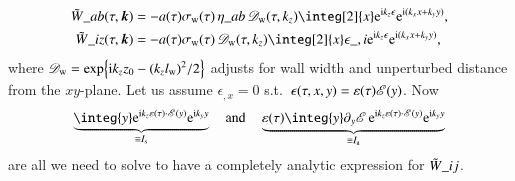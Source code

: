     \begin{equation}\label{eq:pertwalls:gws:Ft_SE_tensor_general}
        \begin{split}
            \Twf\_{ab}(\tau, \vec{k}) &=  -a (\tau)\sigma\ped{w}(\tau)  \, \eta\_{ab} \, \mathscr{D}\ped{w}(\tau,k_z) \integ[2]{x} \eu[\im k_z \epsilon] \eu[\im (k_x x+k_y y)], \\
            \Twf\_{iz}(\tau, \vec{k})
            &= -a (\tau)\sigma\ped{w}(\tau) \,\mathscr{D}\ped{w}(\tau, k_z)  \integ[2]{x} \epsilon\_{,i}  \eu[\im k_z \epsilon] \eu[\im (k_x x+k_y y)],%
         \end{split}
    \end{equation}
    where $\mathscr{D}_\mathrm{w}= \exp{ \ensuremath{\mathrm{i}}k_z z_0-{(k_z l\ensuremath{_\mathrm{w}})}^2/2 }$ adjusts for wall width and unperturbed distance from the $xy$-plane. %
    Let us assume $\epsilon_{,x}=0$ s.t.~$\epsilon(\tau,x,y)=\varepsilon(\tau)\mathscr{E}(y)$. %
    Now
    \begin{equation}\label{eq:pertwalls:gws:def_I_s_and_a}
        \underbrace{\integ{y} \eu[\im k_z \varepsilon(\tau) \cdot \sppt(y)] \eu[\im k_y y]}_{\equiv  I\ped{s}}  \quad \text{and}\quad %
        \underbrace{\varepsilon(\tau)\integ{y} \partial_y \sppt\, \eu[\im k_z \varepsilon(\tau) \cdot \sppt(y)] \eu[\im k_y y]}_{\equiv I\ped{a}}
    \end{equation}
    are all we need to solve to have a completely analytic expression for $\tilde{W}\_{ij}$.%

